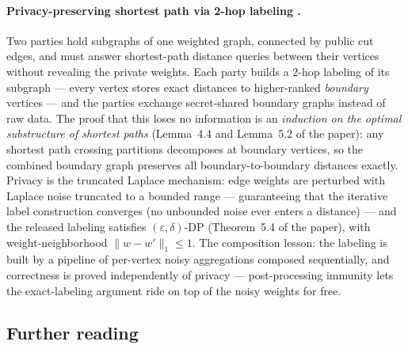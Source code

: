 \paragraph{Privacy-preserving shortest path via 2-hop labeling \citep{sigmod26-214}.}
Two parties hold subgraphs of one weighted graph, connected by public cut edges, and
must answer shortest-path distance queries between their vertices without revealing
the private weights. Each party builds a 2-hop labeling of its subgraph --- every
vertex stores exact distances to higher-ranked \emph{boundary} vertices --- and the
parties exchange secret-shared boundary graphs instead of raw data. The proof that
this loses no information is an \emph{induction on the optimal substructure of
shortest paths} (Lemma~4.4 and Lemma~5.2 of the paper): any shortest path crossing
partitions decomposes at boundary vertices, so the combined boundary graph preserves
all boundary-to-boundary distances exactly. Privacy is the truncated Laplace
mechanism: edge weights are perturbed with Laplace noise truncated to a bounded range
--- guaranteeing that the iterative label construction converges (no unbounded noise
ever enters a distance) --- and the released labeling satisfies
$(\varepsilon,\delta)$-DP (Theorem~5.4 of the paper), with weight-neighborhood
$\|w - w'\|_1 \le 1$. The composition lesson: the labeling is built by a pipeline of
per-vertex noisy aggregations composed sequentially, and correctness is proved
independently of privacy --- post-processing immunity lets the exact-labeling argument
ride on top of the noisy weights for free.

\subsection*{Further reading}

